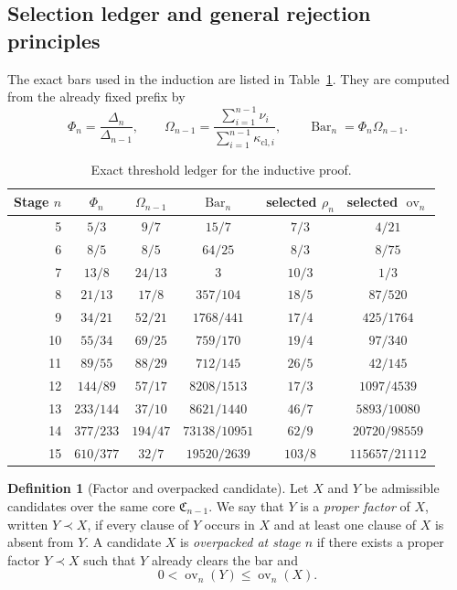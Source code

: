 \documentclass{lmcs}
\theoremstyle{plain}
\theoremstyle{definition}
\newtheorem{defi}[thm]{Definition}
\theoremstyle{remark}
\newcommand{\Core}{\ensuremath{\mathfrak{C}}}
\newcommand{\SelBar}{\ensuremath{\operatorname{Bar}}}
\newcommand{\ov}{\ensuremath{\operatorname{ov}}}
\begin{document}
\subsection{Selection ledger and general rejection principles}

The exact bars used in the induction are listed in Table~\ref{tab:appendix-ledger}.
They are computed from the already fixed prefix by
\[
  \Phi_n=\frac{\Delta_n}{\Delta_{n-1}},\qquad
  \Omega_{n-1}=\frac{\sum_{i=1}^{n-1}\nu_i}{\sum_{i=1}^{n-1}\kappa_{\mathrm{cl},i}},\qquad
  \SelBar_n=\Phi_n\Omega_{n-1}.
\]

\begin{table}[tbp]
\centering
\caption{Exact threshold ledger for the inductive proof.}
\label{tab:appendix-ledger}
\small
\begin{tabular}{@{}rccccc@{}}
\toprule
Stage $n$ & $\Phi_n$ & $\Omega_{n-1}$ & $\SelBar_n$ & selected $\rho_n$ & selected $\ov_n$ \\
\midrule
5  & $5/3$   & $9/7$   & $15/7$        & $7/3$    & $4/21$ \\
6  & $8/5$   & $8/5$   & $64/25$       & $8/3$    & $8/75$ \\
7  & $13/8$  & $24/13$ & $3$           & $10/3$   & $1/3$ \\
8  & $21/13$ & $17/8$  & $357/104$     & $18/5$   & $87/520$ \\
9  & $34/21$ & $52/21$ & $1768/441$    & $17/4$   & $425/1764$ \\
10 & $55/34$ & $69/25$ & $759/170$     & $19/4$   & $97/340$ \\
11 & $89/55$ & $88/29$ & $712/145$     & $26/5$   & $42/145$ \\
12 & $144/89$& $57/17$ & $8208/1513$   & $17/3$   & $1097/4539$ \\
13 & $233/144$& $37/10$& $8621/1440$   & $46/7$   & $5893/10080$ \\
14 & $377/233$& $194/47$& $73138/10951$& $62/9$   & $20720/98559$ \\
15 & $610/377$& $32/7$ & $19520/2639$  & $103/8$  & $115657/21112$ \\
\bottomrule
\end{tabular}
\end{table}

\begin{defi}[Factor and overpacked candidate]
Let $X$ and $Y$ be admissible candidates over the same core $\Core_{n-1}$.
We say that $Y$ is a \emph{proper factor} of $X$, written $Y\prec X$, if every clause of $Y$ occurs in $X$ and at least one clause of $X$ is absent from $Y$.
A candidate $X$ is \emph{overpacked at stage $n$} if there exists a proper factor $Y\prec X$ such that $Y$ already clears the bar and
\[
  0<\ov_n(Y)\le \ov_n(X).
\]
\end{defi}
\end{document}
